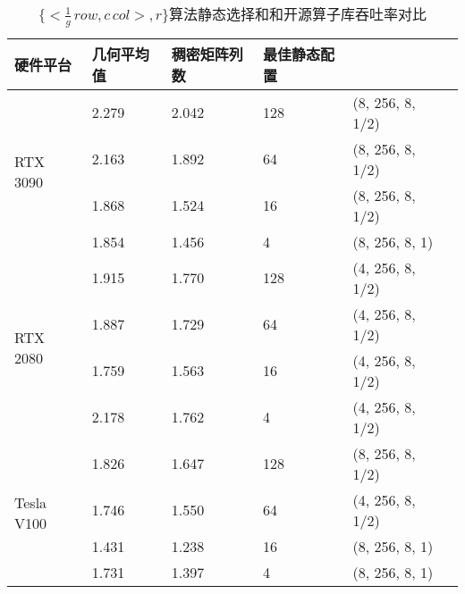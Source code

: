 \begin{table}
  \centering
  \caption{$\{<\frac{1}{g}\,row , c\,col>,r\}$算法静态选择和和开源算子库吞吐率对比}
  \begin{tabular}{llllll}
  \toprule
  硬件平台 & 几何平均值  & 稠密矩阵列数 & 最佳静态配置 \\
  \midrule
  \multirow{4}{*}{RTX 3090}& 2.279 & 2.042  & 128 & (8, 256, 8, 1/2)\\
                           & 2.163 & 1.892  & 64 & (8, 256, 8, 1/2)\\
                           & 1.868 & 1.524  & 16 & (8, 256, 8, 1/2)\\
                           & 1.854 & 1.456  & 4 & (8, 256, 8, 1)\\
  \hline
  \multirow{4}{*}{RTX 2080}& 1.915 & 1.770  & 128 & (4, 256, 8, 1/2)\\
                          & 1.887 & 1.729   & 64 & (4, 256, 8, 1/2)\\
                          & 1.759 & 1.563  & 16& (4, 256, 8, 1/2)\\
                          & 2.178 & 1.762   & 4 & (4, 256, 8, 1/2)\\
  \hline
  \multirow{4}{*}{Tesla V100}& 1.826 & 1.647  & 128 & (8, 256, 8, 1/2)\\
                          & 1.746 & 1.550   & 64 & (4, 256, 8, 1/2)\\
                          & 1.431 & 1.238  & 16 & (8, 256, 8, 1)\\
                          & 1.731 & 1.397  & 4 & (8, 256, 8, 1)\\
  \bottomrule
  \end{tabular}
  \label{tab:sta-ori-rb}
\end{table}

